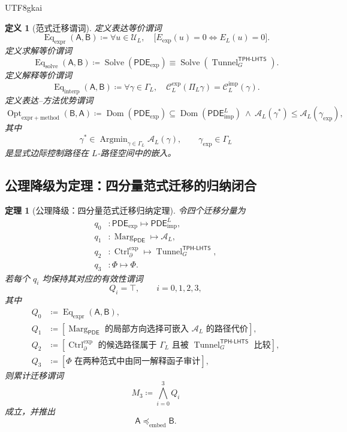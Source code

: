 \documentclass[12pt]{article}
\newtheorem{definition}{定义}[section]
\newtheorem{theorem}{定理}[section]
\newcommand{\DefEq}{\coloneqq}
\newcommand{\Ucal}{\mathcal U}
\newcommand{\TPHLHTS}{\ensuremath{\mathsf{TPH\mbox{-}LHTS}}}
\newcommand{\PDE}{\ensuremath{\mathsf{PDE}}}
\DeclareMathOperator{\Eq}{Eq}
\DeclareMathOperator{\Tunnel}{Tunnel}
\DeclareMathOperator{\Solve}{Solve}
\DeclareMathOperator{\Marg}{Marg}
\DeclareMathOperator{\Ctrl}{Ctrl}
\DeclareMathOperator{\Dom}{Dom}
\DeclareMathOperator{\Opt}{Opt}
\DeclareMathOperator*{\Argmin}{Argmin}
\begin{document}
\begin{CJK*}{UTF8}{gkai}
\begin{definition}[范式迁移谓词]
\label{def:tex58-paradigm-migration-predicates}
定义表达等价谓词
\[
  \Eq_{\mathrm{expr}}(\mathsf A,\mathsf B)
  \DefEq
  \forall u\in\Ucal_L,\quad
  \bigl[
  E_{\mathrm{exp}}(u)=0
  \Longleftrightarrow
  E_L(u)=0
  \bigr].
\]
定义求解等价谓词
\[
  \Eq_{\mathrm{solve}}(\mathsf A,\mathsf B)
  \DefEq
  \Solve(\PDE_{\mathrm{exp}})
  \equiv
  \Solve(\Tunnel_G^{\TPHLHTS}).
\]
定义解释等价谓词
\[
  \Eq_{\mathrm{interp}}(\mathsf A,\mathsf B)
  \DefEq
  \forall \gamma\in\Gamma_L,\quad
  \mathcal C_L^{\mathrm{exp}}(\Pi_L\gamma)
  =
  \mathcal C_L^{\mathrm{imp}}(\gamma).
\]
定义表达--方法优势谓词
\[
  \Opt_{\mathrm{expr+method}}(\mathsf B,\mathsf A)
  \DefEq
  \Dom(\PDE_{\mathrm{exp}})
  \subseteq
  \Dom(\PDE_{\mathrm{imp}}^L)
  \ \wedge\
  \mathcal A_L(\gamma^\ast)\le
  \mathcal A_L(\gamma_{\mathrm{exp}}),
\]
其中
\[
  \gamma^\ast\in\Argmin_{\gamma\in\Gamma_L}\mathcal A_L(\gamma),
  \qquad
  \gamma_{\mathrm{exp}}\in\Gamma_L
\]
是显式边际控制路径在 \(L\)-路径空间中的嵌入。
\end{definition}

\subsection{公理降级为定理：四分量范式迁移的归纳闭合}
\label{subsec:tex58-paradigm-induction}

\begin{theorem}[公理降级：四分量范式迁移归纳定理]
\label{thm:tex58-paradigm-component-induction}
令四个迁移分量为
\[
\begin{aligned}
  q_0 &: \PDE_{\mathrm{exp}}\mapsto\PDE_{\mathrm{imp}}^L,\\
  q_1 &: \Marg_{\PDE}\mapsto\mathcal A_L,\\
  q_2 &: \Ctrl_{\partial}^{\mathrm{exp}}\mapsto\Tunnel_G^{\TPHLHTS},\\
  q_3 &: \Phi\mapsto\Phi.
\end{aligned}
\]
若每个 \(q_i\) 均保持其对应的有效性谓词
\[
  Q_i=\top,
  \qquad
  i=0,1,2,3,
\]
其中
\[
\begin{aligned}
  Q_0&\DefEq \Eq_{\mathrm{expr}}(\mathsf A,\mathsf B),\\
  Q_1&\DefEq
  \left[
  \Marg_{\PDE}\text{ 的局部方向选择可嵌入 }\mathcal A_L\text{ 的路径代价}
  \right],\\
  Q_2&\DefEq
  \left[
  \Ctrl_{\partial}^{\mathrm{exp}}\text{ 的候选路径属于 }\Gamma_L
  \text{ 且被 }\Tunnel_G^{\TPHLHTS}\text{ 比较}
  \right],\\
  Q_3&\DefEq
  \left[
  \Phi\text{ 在两种范式中由同一解释函子审计}
  \right],
\end{aligned}
\]
则累计迁移谓词
\[
  M_3
  \DefEq
  \bigwedge_{i=0}^{3}Q_i
\]
成立，并推出
\[
  \mathsf A
  \preccurlyeq_{\mathrm{embed}}
  \mathsf B.
\]
\end{theorem}


\end{CJK*}
\end{document}
